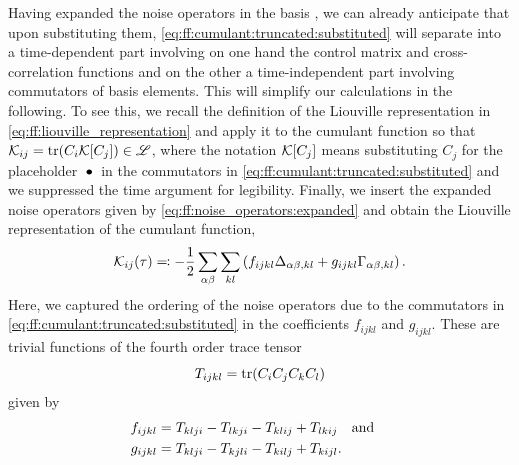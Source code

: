 Having expanded the noise operators in the basis \basis, we can already anticipate that upon substituting them, \cref{eq:ff:cumulant:truncated:substituted} will separate into a time-dependent part involving on one hand the control matrix and cross-correlation functions and on the other a time-independent part involving commutators of basis elements.
This will simplify our calculations in the following.
To see this, we recall the definition of the Liouville representation in \cref{eq:ff:liouville_representation} and apply it to the cumulant function so that $\mathcal{K}_{ij} = \tr(C_i\mathcal{K}[C_j])\in\mathscr{L}$, where the notation $\mathcal{K}[C_j]$ means substituting $C_j$ for the placeholder $\:\bullet\:$ in the commutators in \cref{eq:ff:cumulant:truncated:substituted} and we suppressed the time argument for legibility.
Finally, we insert the expanded noise operators given by \cref{eq:ff:noise_operators:expanded} and obtain the Liouville representation of the cumulant function,
\begin{equation}
    \mathcal{K}_{ij}(\tau) \eqqcolon -\frac{1}{2}\sum_{\alpha\beta} \sum_{kl}\left(
        f_{ijkl}\Delta_{\alpha\beta,kl} + g_{ijkl}\Gamma_{\alpha\beta,kl}
    \right). \label{eq:ff:cumulant:truncated:liouville}
\end{equation}
Here, we captured the ordering of the noise operators due to the commutators in \cref{eq:ff:cumulant:truncated:substituted} in the coefficients $f_{ijkl}$ and $g_{ijkl}$.
These are trivial functions of the fourth order trace tensor
\begin{equation}\label{eq:ff:trace_tensor}
    T_{ijkl} = \tr(C_i C_j C_k C_l)
\end{equation}
given by
\begin{subequations}
    \begin{align}\label{eq:ff:structure_constants}
        f_{ijkl} &= T_{klji} - T_{lkji} - T_{klij} + T_{lkij}\qand \\
        g_{ijkl} &= T_{klji} - T_{kjli} - T_{kilj} + T_{kijl}.
    \end{align}
\end{subequations}
